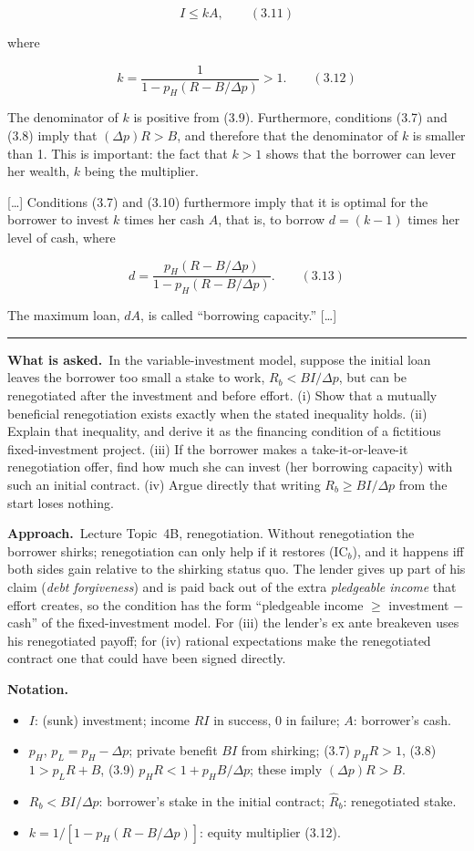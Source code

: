 \documentclass[11pt,a4paper]{article}
\newcommand{\notation}{\par\noindent\textbf{Notation.}}
\newcommand{\asked}{\par\medskip\noindent\textbf{What is asked.}~}
\newcommand{\approach}{\par\smallskip\noindent\textbf{Approach.}~}
\newcommand{\stmtend}{\par\endgroup\nopagebreak\noindent\rule{\linewidth}{0.4pt}\par\medskip}
\begin{document}
\[I \leqslant kA, \qquad (3.11)\]

where

\[k = \frac{1}{1 - p_H(R - B/\Delta p)} > 1. \qquad (3.12)\]

The denominator of \(k\) is positive from (3.9). Furthermore, conditions (3.7) and (3.8) imply that
\((\Delta p)R > B\), and therefore that the denominator of \(k\) is smaller than 1. This is
important: the fact that \(k > 1\) shows that the borrower can lever her wealth, \(k\) being the
multiplier.

{[}\ldots{]} Conditions (3.7) and (3.10) furthermore imply that it is optimal for the borrower to
invest \(k\) times her cash \(A\), that is, to borrow \(d = (k - 1)\) times her level of cash, where

\[d = \frac{p_H(R - B/\Delta p)}{1 - p_H(R - B/\Delta p)}. \qquad (3.13)\]

The maximum loan, \(dA\), is called ``borrowing capacity.'' {[}\ldots{]}
\stmtend

\asked In the variable-investment model, suppose the initial loan leaves the borrower too small a
stake to work, $R_b<BI/\Delta p$, but can be renegotiated after the investment and before effort.
(i) Show that a mutually beneficial renegotiation exists exactly when the stated inequality holds.
(ii) Explain that inequality, and derive it as the financing condition of a fictitious
fixed-investment project. (iii) If the borrower makes a take-it-or-leave-it renegotiation offer,
find how much she can invest (her borrowing capacity) with such an initial contract. (iv) Argue
directly that writing $R_b\ge BI/\Delta p$ from the start loses nothing.

\approach Lecture Topic~4B, renegotiation. Without renegotiation the borrower shirks; renegotiation
can only help if it restores (IC$_b$), and it happens iff both sides gain relative to the shirking
status quo. The lender gives up part of his claim (\emph{debt forgiveness}) and is paid back out of
the extra \emph{pledgeable income} that effort creates, so the condition has the form ``pledgeable
income $\ge$ investment $-$ cash'' of the fixed-investment model. For (iii) the lender's ex ante
breakeven uses his renegotiated payoff; for (iv) rational expectations make the renegotiated contract
one that could have been signed directly.

\notation
\begin{itemize}
  \item $I$: (sunk) investment; income $RI$ in success, $0$ in failure; $A$: borrower's cash.
  \item $p_H$, $p_L=p_H-\Delta p$; private benefit $BI$ from shirking; (3.7) $p_HR>1$, (3.8)
        $1>p_LR+B$, (3.9) $p_HR<1+p_HB/\Delta p$; these imply $(\Delta p)R>B$.
  \item $R_b<BI/\Delta p$: borrower's stake in the initial contract; $\hat R_b$: renegotiated stake.
  \item $k=1/[1-p_H(R-B/\Delta p)]$: equity multiplier (3.12).
\end{itemize}
\end{document}
